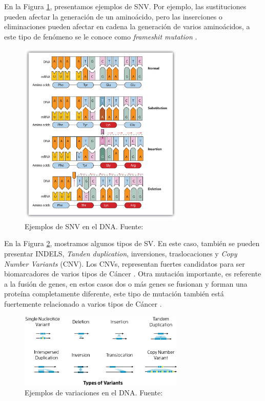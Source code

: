 En la Figura \ref{fig:SNV}, presentamos ejemplos de SNV. Por ejemplo, las sustituciones pueden afectar la generación de un aminoácido, pero las inserciones o eliminaciones pueden afectar en cadena la generación de varios aminoácidos, a este tipo de fenómeno se le conoce como \textit{frameshit mutation} \citep{xu2018review}.


\begin{figure}[h]
	\centering
	\includegraphics[width=0.7\textwidth]{../img/neoantigen/SNV}
	\caption{Ejemplos de SNV en el DNA. Fuente: \cite{socrates2022}}
	\label{fig:SNV}
\end{figure}

En la Figura \ref{fig:variants}, mostramos algunos tipos de SV. En este caso, también se pueden presentar INDELS, \textit{Tanden duplication}, inversiones, traslocaciones y \textit{Copy Number Variants} (CNV). Los CNVs, representan fuertes candidatos para ser biomarcadores de varios tipos de Cáncer \citep{pan2019identification, lucito2007copy}. Otra mutación importante, es referente a la fusión de genes, en estos casos dos o más genes se fusionan y forman una proteína completamente diferente, este tipo de mutación también está fuertemente relacionado a varios tipos de Cáncer \citep{kerbs2022fusion, kim2019fusiongdb, heyer2020sequencing}.

\begin{figure}[h]
	\centering
	\includegraphics[width=0.7\textwidth]{../img/neoantigen/variants}
	\caption{Ejemplos de variaciones en el DNA. Fuente: \cite{sv_pacbio_2021}}
	\label{fig:variants}
\end{figure}


